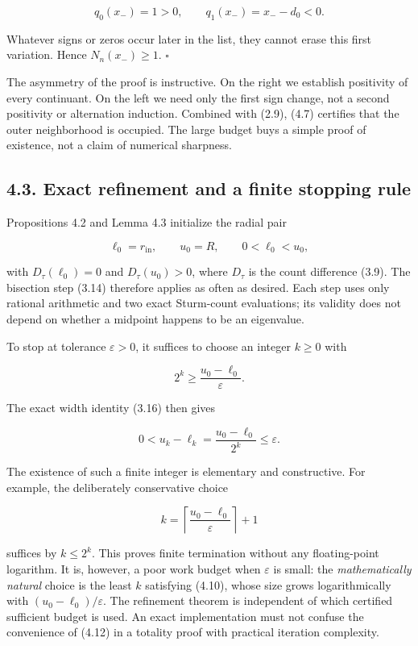 \documentclass[
  11pt,
]{article}
\begin{document}
\[
q_0(x_-)=1>0,
\qquad q_1(x_-)=x_--d_0<0.
\]

Whatever signs or zeros occur later in the list, they cannot erase this
first variation. Hence \(N_n(x_-)\ge1\). \(\square\)

The asymmetry of the proof is instructive. On the right we establish
positivity of every continuant. On the left we need only the first sign
change, not a second positivity or alternation induction. Combined with
(2.9), (4.7) certifies that the outer neighborhood is occupied. The
large budget buys a simple proof of existence, not a claim of numerical
sharpness.

\subsection{4.3. Exact refinement and a finite stopping
rule}\label{exact-refinement-and-a-finite-stopping-rule}

Propositions 4.2 and Lemma 4.3 initialize the radial pair

\[
\ell_0=r_{\mathrm{in}},\qquad u_0=R,
\qquad 0<\ell_0<u_0,
\tag{4.9}
\]

with \(D_\tau(\ell_0)=0\) and \(D_\tau(u_0)>0\), where \(D_\tau\) is the
count difference (3.9). The bisection step (3.14) therefore applies as
often as desired. Each step uses only rational arithmetic and two exact
Sturm-count evaluations; its validity does not depend on whether a
midpoint happens to be an eigenvalue.

To stop at tolerance \(\varepsilon>0\), it suffices to choose an integer
\(k\ge0\) with

\[
2^k\ge\frac{u_0-\ell_0}{\varepsilon}.
\tag{4.10}
\]

The exact width identity (3.16) then gives

\[
0<u_k-\ell_k
=\frac{u_0-\ell_0}{2^k}
\le\varepsilon.
\tag{4.11}
\]

The existence of such a finite integer is elementary and constructive.
For example, the deliberately conservative choice

\[
k=\left\lceil\frac{u_0-\ell_0}{\varepsilon}\right\rceil+1
\tag{4.12}
\]

suffices by \(k\le2^k\). This proves finite termination without any
floating-point logarithm. It is, however, a poor work budget when
\(\varepsilon\) is small: the \emph{mathematically natural} choice is
the least \(k\) satisfying (4.10), whose size grows logarithmically with
\((u_0-\ell_0)/\varepsilon\). The refinement theorem is independent of
which certified sufficient budget is used. An exact implementation must
not confuse the convenience of (4.12) in a totality proof with practical
iteration complexity.
\end{document}

